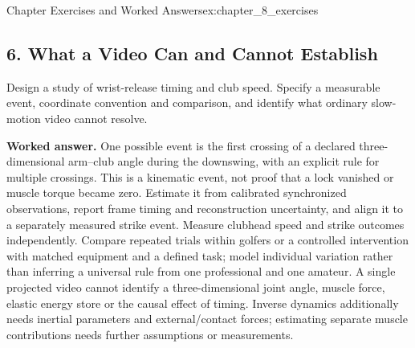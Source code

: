 \begin{exercises}{Chapter Exercises and Worked Answers}{ex:chapter_8_exercises}
\newpage
\subsection*{6. What a Video Can and Cannot Establish}
Design a study of wrist-release timing and club speed. Specify a measurable event, coordinate convention and comparison, and identify what ordinary slow-motion video cannot resolve.

\textbf{Worked answer.} One possible event is the first crossing of a declared three-dimensional arm--club angle during the downswing, with an explicit rule for multiple crossings. This is a kinematic event, not proof that a lock vanished or muscle torque became zero. Estimate it from calibrated synchronized observations, report frame timing and reconstruction uncertainty, and align it to a separately measured strike event. Measure clubhead speed and strike outcomes independently. Compare repeated trials within golfers or a controlled intervention with matched equipment and a defined task; model individual variation rather than inferring a universal rule from one professional and one amateur. A single projected video cannot identify a three-dimensional joint angle, muscle force, elastic energy store or the causal effect of timing. Inverse dynamics additionally needs inertial parameters and external/contact forces; estimating separate muscle contributions needs further assumptions or measurements.
\end{exercises}

\clearpage
\flushbottom{}
